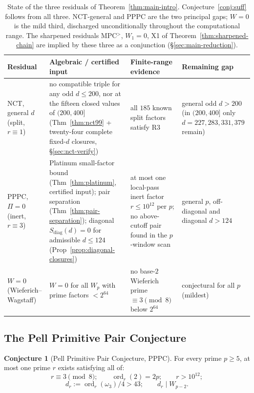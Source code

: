 \documentclass[11pt]{amsart}
\theoremstyle{plain}
\theoremstyle{definition}
\newtheorem{conjecture}[theorem]{Conjecture}
\theoremstyle{remark}
\numberwithin{equation}{section}
\newcommand{\ord}{\operatorname{ord}}
\begin{document}
\begin{table}[ht]
\centering
\footnotesize
\renewcommand{\arraystretch}{1.25}
\begin{tabular}{@{}p{2.45cm}p{3.05cm}p{4.15cm}p{2.2cm}@{}}
\hline
Residual & Algebraic / certified input & Finite-range evidence & Remaining gap \\
\hline
NCT, general $d$ \newline (split, $r \equiv 1$) & no compatible triple for any odd $d \leq 200$, nor at the fifteen closed values of $(200, 400]$ (Thm~\ref{thm:nct99} + twenty-four complete fixed-$d$ closures, \S\ref{sec:nct-verify}) & all $185$ known split factors satisfy R3 & general odd $d > 200$ (in $(200,400]$ only $d = 227, 283, 331, 379$ remain) \\
PPPC, $\Pi = 0$ \newline (inert, $r \equiv 3$) & Platinum small-factor bound (Thm~\ref{thm:platinum}, certified input); pair separation (Thm~\ref{thm:pair-separation}); diagonal $S_{\mathrm{diag}}(d) = 0$ for admissible $d \leq 124$ (Prop~\ref{prop:diagonal-closures}) & at most one local-pass inert factor $r \leq 10^{12}$ per $p$; no above-cutoff pair found in the $p$-window scan & general $p$, off-diagonal and diagonal $d > 124$ \\
$W = 0$ \newline (Wieferich--Wagstaff) & $W = 0$ for all $W_p$ with prime factors $< 2^{64}$ & no base-$2$ Wieferich prime $\equiv 3 \pmod 8$ below $2^{64}$ & conjectural for all $p$ (mildest) \\
\hline
\end{tabular}
\caption{State of the three residuals of Theorem~\ref{thm:main-intro}. Conjecture~\ref{conj:suff} follows from all three. NCT-general and PPPC are the two principal gaps; $W = 0$ is the mild third, discharged unconditionally throughout the computational range. The sharpened residuals MPC$^{>}$, $W_1 = 0$, X1 of Theorem~\ref{thm:sharpened-chain} are implied by these three as a conjunction (\S\ref{sec:main-reduction}).}
\label{tab:status}
\end{table}

\subsection{The Pell Primitive Pair Conjecture}\label{sec:pppc-statement}

\begin{conjecture}[Pell Primitive Pair Conjecture, PPPC]\label{conj:pppc-intro}
For every prime $p \geq 5$, at most one prime $r$ exists satisfying all of:
\[
  r \equiv 3 \pmod 8; \qquad \ord_r(2) = 2 p; \qquad r > 10^{12};
\]
\[
  d_r := \ord_r(\omega_3)/4 > 43; \qquad d_r \mid W_{p-2}.
\]
\end{conjecture}
\end{document}

